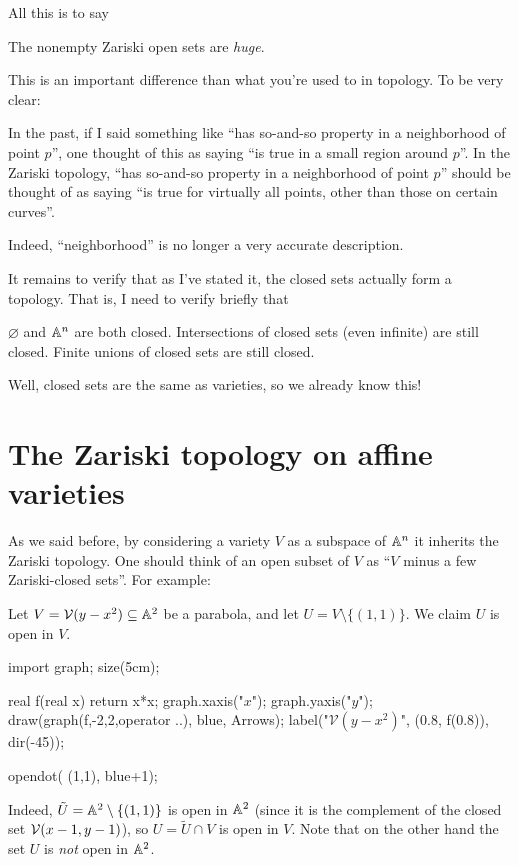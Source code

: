 \documentclass[11pt]{scrreprt}
\begin{document}
All this is to say
\begin{moral}
	The nonempty Zariski open sets are \emph{huge}.
\end{moral}
This is an important difference than what you're used to in topology.
To be very clear:
\begin{itemize}
	\ii In the past, if I said something like ``has so-and-so property in a neighborhood of point $p$'',
	one thought of this as saying ``is true in a small region around $p$''.
	\ii In the Zariski topology, ``has so-and-so property in a neighborhood of point $p$'' should be thought
	of as saying ``is true for virtually all points, other than those on certain curves''.
\end{itemize}
Indeed, ``neighborhood'' is no longer a very accurate description.

It remains to verify that as I've stated it, the closed sets actually form a topology.
That is, I need to verify briefly that
\begin{itemize}
	\ii $\varnothing$ and $\mathbb A^n$ are both closed.
	\ii Intersections of closed sets (even infinite) are still closed.
	\ii Finite unions of closed sets are still closed.
\end{itemize}
Well, closed sets are the same as varieties, so we already know this!

\section{The Zariski topology on affine varieties}

As we said before, by considering a variety $V$ as a subspace of $\mathbb A^n$
it inherits the Zariski topology.
One should think of an open subset of $V$ as ``$V$ minus a few Zariski-closed sets''.
For example:
\begin{example}
	Let $V = \mathcal V(y-x^2) \subseteq \mathbb A^2$ be a parabola,
	and let $U = V \setminus \{(1,1)\}$. We claim $U$ is open in $V$.
	\begin{center}
		\begin{asy}
		import graph;
		size(5cm);

		real f(real x) { return x*x; }
		graph.xaxis("$x$");
		graph.yaxis("$y$");
		draw(graph(f,-2,2,operator ..), blue, Arrows);
		label("$\mathcal V(y-x^2)$", (0.8, f(0.8)), dir(-45));

		opendot( (1,1), blue+1);
		\end{asy}
	\end{center}
	Indeed, $\tilde U = \mathbb A^2 \setminus \{(1,1)\}$ is open in $\mathbb A^2$
	(since it is the complement of the closed set $\mathcal V(x-1,y-1)$),
	so $U = \tilde U \cap V$ is open in $V$.
	Note that on the other hand the set $U$ is \emph{not} open in $\mathbb A^2$.
\end{example}
\end{document}

